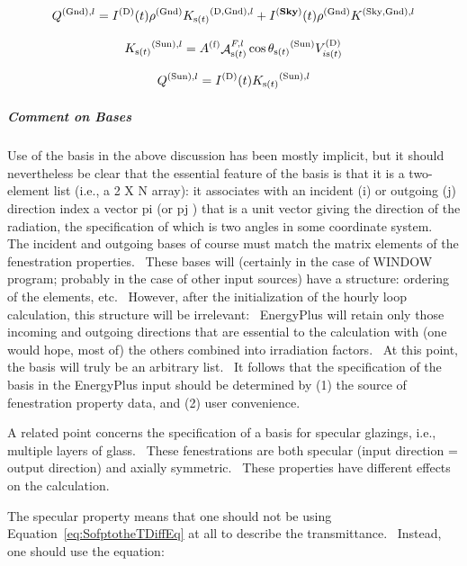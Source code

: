\begin{equation}
{Q^{{\rm{(Gnd)}},l}} = {I^{{\rm{(D)}}}}(t){\rho ^{{\rm{(Gnd)}}}}{K_{{\rm{s(}}t{\rm{)}}}}^{{\rm{(D, Gnd)}},l} + {I^{({\bf{Sky}})}}(t){\rho ^{{\rm{(Gnd)}}}}{K^{{\rm{(Sky, Gnd)}},l}}
\end{equation}

\begin{equation}
{K_{{\rm{s(}}t{\rm{)}}}}^{{\rm{(Sun)}},l} = {A^{{\rm{(f)}}}}{\mathop{\rm \mathcal{A}}\nolimits}_{{\rm{s}}(t)}^{F,l}\cos {\theta_{{\rm{s(}}t{\rm{)}}}}^{{\rm{(Sun)}}}V_{i{\rm{ s(}}t{\rm{)}}}^{{\rm{(D)}}}
\end{equation}

\begin{equation}
{Q^{{\rm{(Sun)}},l}} = {I^{{\rm{(D)}}}}(t){K_{{\rm{s(}}t{\rm{)}}}}^{{\rm{(Sun)}},l}
\end{equation}

\subparagraph{Comment on Bases}\label{comment-on-bases}

Use of the basis in the above discussion has been mostly implicit, but it should nevertheless be clear that the essential feature of the basis is that it is a two-element list (i.e., a 2 X N array): it associates with an incident (i) or outgoing (j) direction index a vector pi (or pj ) that is a unit vector giving the direction of the radiation, the specification of which is two angles in some coordinate system.~ The incident and outgoing bases of course must match the matrix elements of the fenestration properties.~ These bases will (certainly in the case of WINDOW program; probably in the case of other input sources) have a structure: ordering of the elements, etc.~ However, after the initialization of the hourly loop calculation, this structure will be irrelevant:~ EnergyPlus will retain only those incoming and outgoing directions that are essential to the calculation with (one would hope, most of) the others combined into irradiation factors.~ At this point, the basis will truly be an arbitrary list.~ It follows that the specification of the basis in the EnergyPlus input should be determined by (1) the source of fenestration property data, and (2) user convenience.

A related point concerns the specification of a basis for specular glazings, i.e., multiple layers of glass.~ These fenestrations are both specular (input direction = output direction) and axially symmetric.~ These properties have different effects on the calculation.

The specular property means that one should not be using Equation~\ref{eq:SofptotheTDiffEq} at all to describe the transmittance.~ Instead, one should use the equation:


